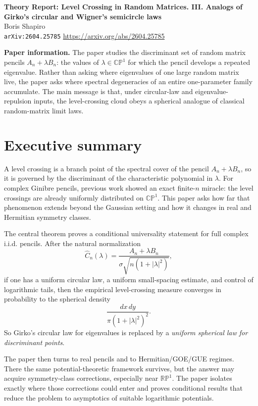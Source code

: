 \documentclass[11pt]{article}
\begin{document}
\begin{center}
{\Large \textbf{Theory Report: Level Crossing in Random Matrices. III. Analogs of Girko's circular and Wigner's semicircle laws}}\\[0.5em]
{\large Boris Shapiro}\\[0.25em]
\texttt{arXiv:2604.25785} \quad \url{https://arxiv.org/abs/2604.25785}
\end{center}

\textbf{Paper information.} The paper studies the discriminant set of random matrix pencils $A_n+\lambda B_n$: the values of $\lambda\in\mathbb{CP}^1$ for which the pencil develops a repeated eigenvalue. Rather than asking where eigenvalues of one large random matrix live, the paper asks where spectral degeneracies of an entire one-parameter family accumulate. The main message is that, under circular-law and eigenvalue-repulsion inputs, the level-crossing cloud obeys a spherical analogue of classical random-matrix limit laws.

\section*{Executive summary}
A level crossing is a branch point of the spectral cover of the pencil $A_n+\lambda B_n$, so it is governed by the discriminant of the characteristic polynomial in $\lambda$. For complex Ginibre pencils, previous work showed an exact finite-$n$ miracle: the level crossings are already uniformly distributed on $\mathbb{CP}^1$. This paper asks how far that phenomenon extends beyond the Gaussian setting and how it changes in real and Hermitian symmetry classes.

The central theorem proves a conditional universality statement for full complex i.i.d. pencils. After the natural normalization
\[
\widehat C_n(\lambda)=\frac{A_n+\lambda B_n}{\sigma\sqrt{n(1+|\lambda|^2)}},
\]
if one has a uniform circular law, a uniform small-spacing estimate, and control of logarithmic tails, then the empirical level-crossing measure converges in probability to the spherical density
\[
\frac{dx\,dy}{\pi(1+|\lambda|^2)^2}.
\]
So Girko's circular law for eigenvalues is replaced by a \emph{uniform spherical law for discriminant points}.

The paper then turns to real pencils and to Hermitian/GOE/GUE regimes. There the same potential-theoretic framework survives, but the answer may acquire symmetry-class corrections, especially near $\mathbb{RP}^1$. The paper isolates exactly where those corrections could enter and proves conditional results that reduce the problem to asymptotics of suitable logarithmic potentials.
\end{document}

